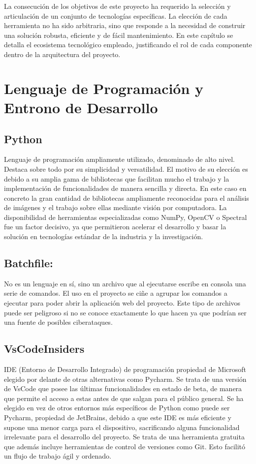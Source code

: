 
La consecución de los objetivos de este proyecto ha requerido la selección y articulación de un conjunto de tecnologías específicas. La elección de cada herramienta no ha sido arbitraria, sino que responde a la necesidad de construir una solución robusta, eficiente y de fácil mantenimiento. En este capítulo se detalla el ecosistema tecnológico empleado, justificando el rol de cada componente dentro de la arquitectura del proyecto. 

\section{Lenguaje de Programación y Entrono de Desarrollo}

\subsection{Python }
Lenguaje de programación ampliamente utilizado, denominado de alto nivel. Destaca sobre todo  por su simplicidad y versatilidad\cite{PythonDocs311}. El motivo de su elección es debido a su amplia gama de bibliotecas que facilitan mucho el trabajo y la implementación de funcionalidades de manera sencilla y directa. En este caso en concreto la gran cantidad de bibliotecas ampliamente reconocidas para el análisis de imágenes y el trabajo sobre ellas mediante visión por computadora. La disponibilidad de herramientas especializadas como NumPy, OpenCV o Spectral fue un factor decisivo, ya que permitieron acelerar el desarrollo y basar la solución en tecnologías estándar de la industria y la investigación. 

\subsection{Batchfile:}
No es un lenguaje en sí, sino un archivo que al ejecutarse escribe en consola una serie de comandos. El uso en el proyecto se ciñe a agrupar los comandos a ejecutar para poder abrir la aplicación web del proyecto. Este tipo de archivos puede ser peligroso si no se conoce exactamente lo que hacen ya que podrían ser una fuente de posibles ciberataques.

\subsection{VsCodeInsiders}
IDE (Entorno de Desarrollo Integrado) de programación propiedad de Microsoft elegido por delante de otras alternativas como Pycharm. Se trata de una versión de VsCode\cite{VSCode2025} que posee las últimas funcionalidades en estado de beta, de manera que permite el acceso a estas antes de que salgan para el público general.  Se ha elegido en vez de otros entornos más específicos de Python como puede ser Pycharm, propiedad de JetBrains, debido a que este IDE es más eficiente y supone una menor carga para el dispositivo, sacrificando alguna funcionalidad irrelevante para el desarrollo del proyecto. Se trata de una herramienta gratuita que además incluye herramientas de control de versiones como Git. Esto facilitó un flujo de trabajo ágil y ordenado.



